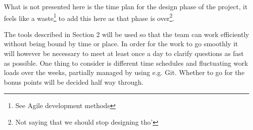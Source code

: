 		What is not presented here is the time plan for the design phase of the project, it feels like a waste\footnote{See Agile development methods} to add this here as that phase is over\footnote{Not saying that we should stop designing tho'}.

		The tools described in Section 2 will be used so that the team can work efficiently without being bound by time or place.
		In order for the work to go smoothly it will however be necessary to meet at least once a day to clarify questions as fast as possible.
		One thing to consider is different time schedules and fluctuating work loads over the weeks, partially managed by using e.g. Git.
		Whether to go for the bonus points will be decided half way through.
